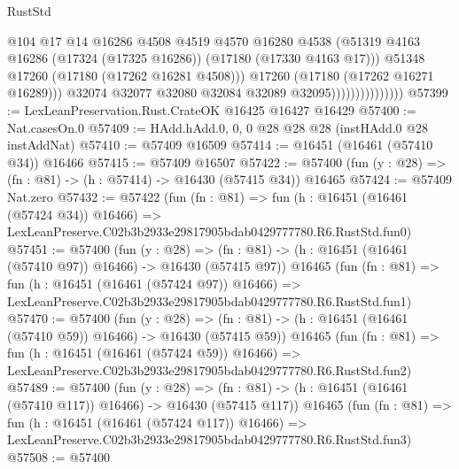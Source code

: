 \begin{lexlean}{RustStd}
\begin{coremodule}
                                      @104
                                      @17
                                      @14
                                      @16286
                                      @4508
                                      @4519
                                      @4570
                                      @16280
                                      @4538
                                      (@51319
                                        @4163
                                        @16286
                                        (@17324 (@17325 @16286))
                                        (@17180 (@17330 @4163 @17)))
                                      @51348
                                      @17260
                                      (@17180 (@17262 @16281 @4508)))
                                    @17260
                                    (@17180 (@17262 @16271 @16289)))
                                  @32074
                                  @32077
                                  @32080
                                  @32084
                                  @32089
                                  @32095)))))))))))))))
@57399 := LexLeanPreservation.Rust.CrateOK @16425 @16427 @16429
@57400 := Nat.casesOn.{0}
@57409 := HAdd.hAdd.{0, 0, 0} @28 @28 @28 (instHAdd.{0} @28 instAddNat)
@57410 := @57409 @16509
@57414 := @16451 (@16461 (@57410 @34)) @16466
@57415 := @57409 @16507
@57422 := @57400 (fun (y : @28) => (fn : @81) -> (h : @57414) -> @16430 (@57415 @34)) @16465
@57424 := @57409 Nat.zero
@57432 := @57422
    (fun (fn : @81) =>
    fun (h : @16451 (@16461 (@57424 @34)) @16466) =>
    LexLeanPreserve.C02b3b2933e29817905bdab0429777780.R6.RustStd.fun0)
@57451 := @57400
    (fun (y : @28) =>
    (fn : @81) -> (h : @16451 (@16461 (@57410 @97)) @16466) -> @16430 (@57415 @97))
    @16465
    (fun (fn : @81) =>
    fun (h : @16451 (@16461 (@57424 @97)) @16466) =>
    LexLeanPreserve.C02b3b2933e29817905bdab0429777780.R6.RustStd.fun1)
@57470 := @57400
    (fun (y : @28) =>
    (fn : @81) -> (h : @16451 (@16461 (@57410 @59)) @16466) -> @16430 (@57415 @59))
    @16465
    (fun (fn : @81) =>
    fun (h : @16451 (@16461 (@57424 @59)) @16466) =>
    LexLeanPreserve.C02b3b2933e29817905bdab0429777780.R6.RustStd.fun2)
@57489 := @57400
    (fun (y : @28) =>
    (fn : @81) -> (h : @16451 (@16461 (@57410 @117)) @16466) -> @16430 (@57415 @117))
    @16465
    (fun (fn : @81) =>
    fun (h : @16451 (@16461 (@57424 @117)) @16466) =>
    LexLeanPreserve.C02b3b2933e29817905bdab0429777780.R6.RustStd.fun3)
@57508 := @57400

\end{coremodule}
\end{lexlean}
